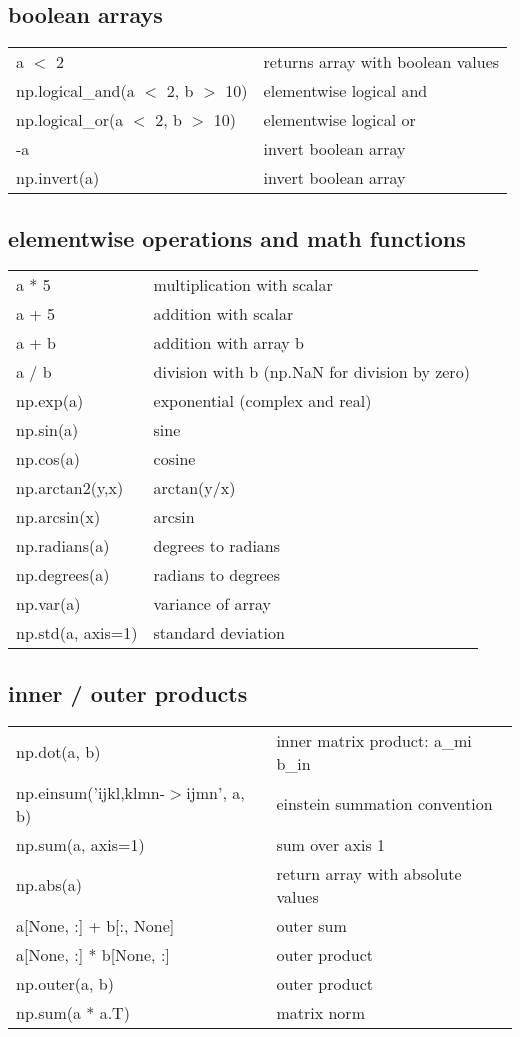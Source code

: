 \documentclass[10pt, a4paper, twocolumn]{article}
\begin{document}
\subsection*{boolean arrays}
\begin{tabular}{ p{} p{} }
  a $<$ 2 & returns array with boolean values\\
  np.logical\_and(a $<$ 2, b $>$ 10) & elementwise logical and\\
  np.logical\_or(a $<$ 2, b $>$ 10) & elementwise logical or\\
  -a & invert boolean array\\
  np.invert(a) & invert boolean array\\
\end{tabular}

\subsection*{elementwise operations and math functions}
\begin{tabular}{ p{} p{} }
  a * 5 & multiplication with scalar\\
  a + 5 & addition with scalar\\
  a + b & addition with array b\\
  a / b & division with b (np.NaN for division by zero)\\
  np.exp(a) & exponential (complex and real)\\
  np.sin(a) & sine\\
  np.cos(a) & cosine\\
  np.arctan2(y,x) & arctan(y/x)\\
  np.arcsin(x) & arcsin\\
  np.radians(a) & degrees to radians\\
  np.degrees(a) & radians to degrees\\
  np.var(a) & variance of array\\
  np.std(a, axis=1) & standard deviation\\
\end{tabular}

\subsection*{inner / outer products}
\begin{tabular}{ p{} p{} }
  np.dot(a, b) & inner matrix product: a\_mi b\_in \\
  np.einsum('ijkl,klmn-$>$ijmn', a, b) & einstein summation convention\\
  np.sum(a, axis=1) & sum over axis 1\\
  np.abs(a) & return array with absolute values\\
  a[None, :] + b[:, None] & outer sum\\
  a[None, :] * b[None, :] & outer product\\
  np.outer(a, b) & outer product\\
  np.sum(a * a.T) & matrix norm\\
\end{tabular}
\end{document}
